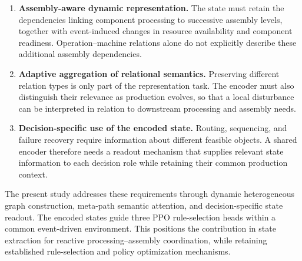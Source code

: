 \begin{enumerate}
\item \textbf{Assembly-aware dynamic representation.} The state must retain the dependencies linking
component processing to successive assembly levels, together with event-induced changes in resource availability
and component readiness. Operation--machine relations alone do not explicitly describe these additional assembly dependencies.

\item \textbf{Adaptive aggregation of relational semantics.} Preserving different relation types is
only part of the representation task. The encoder must also distinguish their relevance as production evolves,
so that a local disturbance can be interpreted in relation to downstream processing and assembly needs.

\item \textbf{Decision-specific use of the encoded state.} Routing, sequencing, and failure recovery
require information about different feasible objects. A shared encoder therefore needs a readout mechanism
that supplies relevant state information to each decision role while retaining their common production context.
\end{enumerate}


The present study addresses these requirements through dynamic heterogeneous graph construction,
meta-path semantic attention, and decision-specific state readout. The encoded states guide three PPO
rule-selection heads within a common event-driven environment. This positions the contribution in state
extraction for reactive processing--assembly coordination, while retaining established rule-selection
and policy optimization mechanisms.


